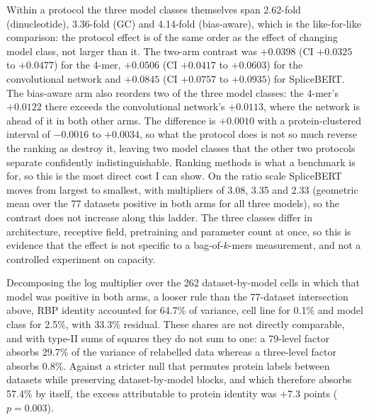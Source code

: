 Within a protocol the
three model classes themselves span 2.62-fold (dinucleotide), 3.36-fold (GC) and 4.14-fold
(bias-aware), which is the like-for-like comparison: the protocol effect is of the same order as
the effect of changing model class, not larger than it. The two-arm contrast was
$+0.0398$ (CI $+0.0325$ to $+0.0477$) for the 4-mer, $+0.0506$ (CI $+0.0417$ to $+0.0603$) for
the convolutional network and $+0.0845$ (CI $+0.0757$ to $+0.0935$) for SpliceBERT. The bias-aware arm also reorders two of the three model classes: the 4-mer's $+0.0122$ there
exceeds the convolutional network's $+0.0113$, where the network is ahead of it in both other
arms. The difference is $+0.0010$ with a protein-clustered interval of $-0.0016$ to $+0.0034$,
so what the protocol does is not so much reverse the ranking as destroy it, leaving two model
classes that the other two protocols separate confidently indistinguishable. Ranking methods is
what a benchmark is for, so this is the most direct cost I can show. On the ratio
scale SpliceBERT moves from largest to smallest, with multipliers of 3.08, 3.35 and 2.33 (geometric mean over the 77
datasets positive in both arms for all three models), so the contrast does not increase along this ladder. The three classes differ in
architecture, receptive field, pretraining and parameter count at once, so this is evidence
that the effect is not specific to a bag-of-$k$-mers measurement, and not a controlled
experiment on capacity.

Decomposing the log multiplier over the 262 dataset-by-model cells in which that model was
positive in both arms, a looser rule than the 77-dataset intersection above, RBP identity
accounted for 64.7\% of variance, cell line for 0.1\% and model class for 2.5\%, with 33.3\%
residual. These shares are not directly comparable, and with type-II sums of squares they do not
sum to one: a 79-level factor absorbs 29.7\% of the variance of relabelled data whereas a
three-level factor absorbs 0.8\%. Against a stricter null that permutes protein labels between
datasets while preserving
dataset-by-model blocks, and which therefore absorbs 57.4\% by itself, the excess attributable
to protein identity was $+7.3$ points ($p=0.003$).

